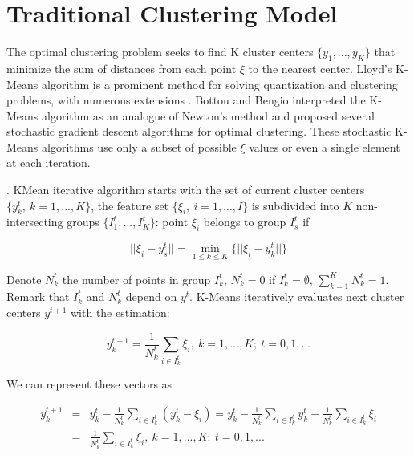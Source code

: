 \section{Traditional Clustering Model}

The optimal clustering problem seeks to find K cluster centers $ \{ y_1, ..., y_K \} $ that minimize the sum of distances from each point $ \xi $ to the nearest center. Lloyd's K-Means algorithm \cite{Lloyd_1982} is a prominent method for solving quantization and clustering problems, with numerous extensions \cite{Jain_2010}. Bottou and Bengio \cite{Bottou_1994} interpreted the K-Means algorithm as an analogue of Newton's method and proposed several stochastic gradient descent algorithms for optimal clustering. These stochastic K-Means algorithms use only a subset of possible $ \xi $ values or even a single element at each iteration.

\begin{definition}
    \label{KMeans} \cite{Lloyd_1982}. KMean iterative algorithm starts with the set of current cluster centers $ \{ y_k^t, \> k = 1, ..., K \} $, the feature set $ \{ \xi_i, \> i = 1, ..., I \} $ is subdivided into $ K $ non-intersecting groups $ \{ I_1^t, ..., I_K^t \} $: point $ \xi_i $ belongs to group $ I_s^t $ if

    \begin{equation}
        \label{kmeans-group:eq}
            || \xi_i - y_s^t || = \min_{1 \leq k \leq K} \{ || \xi_i - y_k^t || \}
    \end{equation}

    \noindent Denote $ N_k^t $ the number of points in group $ I_k^t $, $ N_k^t = 0 $ if $ I_k^t = \emptyset $, $ \sum_{k=1}^K N_k^t = 1 $. Remark that $ I_k^t $ and $ N_k^t $ depend on $ y^t $. K-Means iteratively evaluates next cluster centers $ y^{t+1} $ with the estimation:

    \begin{equation}
        \label{kmeans-center-estimation:eq}
            y_{k}^{t + 1} = \frac{1}{N_k^t} \sum_{i \in I_k^t} \xi_i, \> k = 1, ..., K; \> t = 0, 1, ...
    \end{equation}

    \noindent We can represent these vectors as

    \begin{eqnarray}
        \label{kmeans-center-alt:eq}
            y_{k}^{t + 1} &=& y_k^t - \frac{1}{N_k^t} \sum_{i \in I_k^t} (y_k^t - \xi_i) = y_k^t - \frac{1}{N_k^t} \sum_{i \in I_k^t} y_k^t + \frac{1}{N_k^t} \sum_{i \in I_k^t} \xi_i \nonumber \\
            &=& \frac{1}{N_k^t} \sum_{i \in I_k^t} \xi_i, \> k = 1, ..., K; \> t = 0, 1, ...
    \end{eqnarray}
\end{definition}

